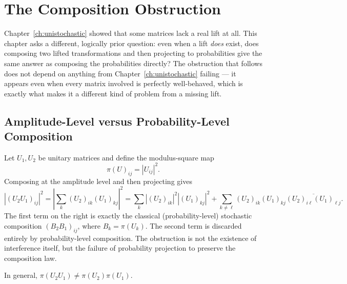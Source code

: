 \chapter{The Composition Obstruction}
\label{ch:composition}

Chapter~\ref{ch:unistochastic} showed that some matrices lack a real lift at
all. This chapter asks a different, logically prior question: even when a
lift \emph{does} exist, does composing two lifted transformations and then
projecting to probabilities give the same answer as composing the
probabilities directly? The obstruction that follows does not depend on
anything from Chapter~\ref{ch:unistochastic} failing — it appears even when
every matrix involved is perfectly well-behaved, which is exactly what makes
it a different kind of problem from a missing lift.

\section{Amplitude-Level versus Probability-Level Composition}

Let $U_1, U_2$ be unitary matrices and define the modulus-square map
\begin{equation}
\pi(U)_{ij} = |U_{ij}|^2.
\end{equation}
Composing at the amplitude level and then projecting gives
\begin{equation}
\left|(U_2 U_1)_{ij}\right|^2
= \left|\sum_k (U_2)_{ik}(U_1)_{kj}\right|^2
= \sum_k |(U_2)_{ik}|^2 |(U_1)_{kj}|^2
+ \sum_{k \neq \ell} (U_2)_{ik}(U_1)_{kj}\overline{(U_2)_{i\ell}(U_1)_{\ell j}}.
\label{eq:composition-expansion}
\end{equation}
The first term on the right is exactly the classical (probability-level) stochastic
composition $(B_2 B_1)_{ij}$, where $B_k = \pi(U_k)$. The second term is discarded
entirely by probability-level composition. The obstruction is not the
existence of interference itself, but the failure of probability projection
to preserve the composition law.

\begin{proposition}
\label{prop:pi-not-homomorphism}
In general, $\pi(U_2 U_1) \neq \pi(U_2)\pi(U_1)$.
\end{proposition}

